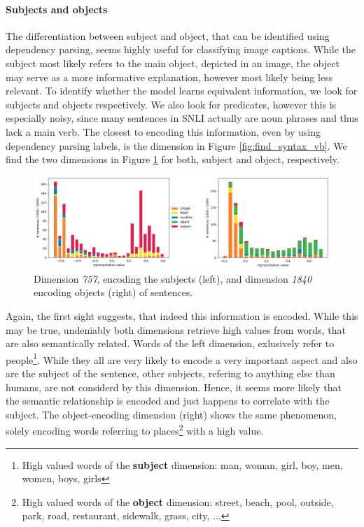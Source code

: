 \paragraph*{Subjects and objects}
The differentiation between subject and object, that can be identified using dependency parsing, seems highly useful for classifying image captions. While the subject most likely refers to the main object, depicted in an image, the object may serve as a more informative explanation, however most likely being less relevant. To identify whether the model learns equivalent information, we look for subjects and objects respectively. We also look for predicates, however this is especially noisy, since many sentences in \ac{SNLI} actually are noun phrases and thus lack a main verb. The closest to encoding this information, even by using dependency parsing labels, is the dimension in Figure \ref{fig:find_syntax_vb}. We find the two dimensions in Figure \ref{fig:find_syntax_subj_obj} for both, subject and object, respectively.
\begin{figure}[tph!]
\centering
	\includegraphics[totalheight=5cm]{fig/find_syntax_subj_obj.png}
	\caption{Dimension \textit{757}, encoding the subjects (left), and dimension \textit{1840} encoding objects (right) of sentences.}
	\label{fig:find_syntax_subj_obj}
\end{figure}
Again, the first sight suggests, that indeed this information is encoded. While this may be true, undeniably both dimensions retrieve high values from words, that are also semantically related. Words of the left dimension, exlusively refer to people\footnote{High valued words of the \textbf{subject} dimension: man, woman, girl, boy, men, women, boys, girls}. While they all are very likely to encode a very important aspect and also are the subject of the sentence, other subjects, refering to anything else than humans, are not considerd by this dimension. Hence, it seems more likely that the semantic relationship is encoded and just happens to correlate with the subject. The object-encoding dimension (right) shows the same phenomenon, solely encoding words referring to places\footnote{High valued words of the \textbf{object} dimension: street, beach, pool, outside, park, road, restaurant, sidewalk, grass, city, ...} with a high value.
\newline

